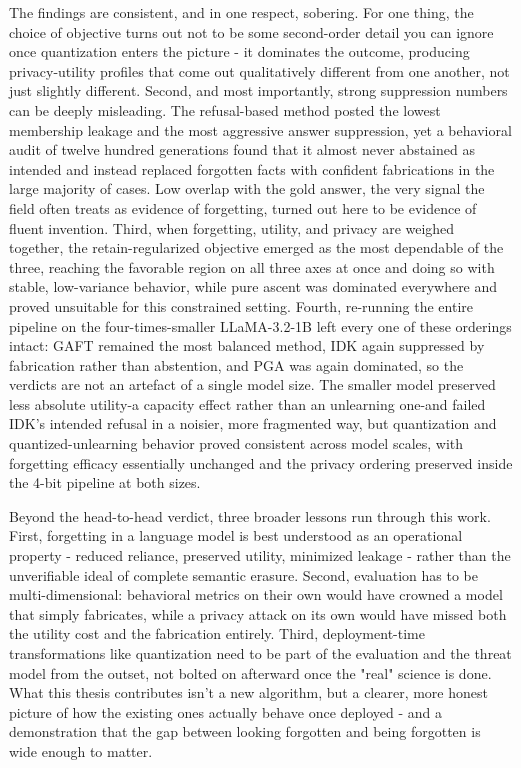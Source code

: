 \documentclass[a4paper,12pt]{report}
\begin{document}
The findings are consistent, and in one respect, sobering. For one thing, the choice of objective turns out not to be some second-order detail you can ignore once quantization enters the picture - it dominates the outcome, producing privacy-utility profiles that come out qualitatively different from one another, not just slightly different. Second, and most importantly, strong suppression numbers can be deeply misleading. The refusal-based method posted the lowest membership leakage and the most aggressive answer suppression, yet a behavioral audit of twelve hundred generations found that it almost never abstained as intended and instead replaced forgotten facts with confident fabrications in the large majority of cases. Low overlap with the gold answer, the very signal the field often treats as evidence of forgetting, turned out here to be evidence of fluent invention. Third, when forgetting, utility, and privacy are weighed together, the retain-regularized objective emerged as the most dependable of the three, reaching the favorable region on all three axes at once and doing so with stable, low-variance behavior, while pure ascent was dominated everywhere and proved unsuitable for this constrained setting. Fourth, re-running the entire pipeline on the four-times-smaller LLaMA-3.2-1B left every one of these orderings intact: GAFT remained the most balanced method, IDK again suppressed by fabrication rather than abstention, and PGA was again dominated, so the verdicts are not an artefact of a single model size. The smaller model preserved less absolute utility-a capacity effect rather than an unlearning one-and failed IDK's intended refusal in a noisier, more fragmented way, but quantization and quantized-unlearning behavior proved consistent across model scales, with forgetting efficacy essentially unchanged and the privacy ordering preserved inside the 4-bit pipeline at both sizes.

Beyond the head-to-head verdict, three broader lessons run through this work. First, forgetting in a language model is best understood as an operational property - reduced reliance, preserved utility, minimized leakage - rather than the unverifiable ideal of complete semantic erasure. Second, evaluation has to be multi-dimensional: behavioral metrics on their own would have crowned a model that simply fabricates, while a privacy attack on its own would have missed both the utility cost and the fabrication entirely. Third, deployment-time transformations like quantization need to be part of the evaluation and the threat model from the outset, not bolted on afterward once the "real" science is done. What this thesis contributes isn't a new algorithm, but a clearer, more honest picture of how the existing ones actually behave once deployed - and a demonstration that the gap between looking forgotten and being forgotten is wide enough to matter.
\end{document}
